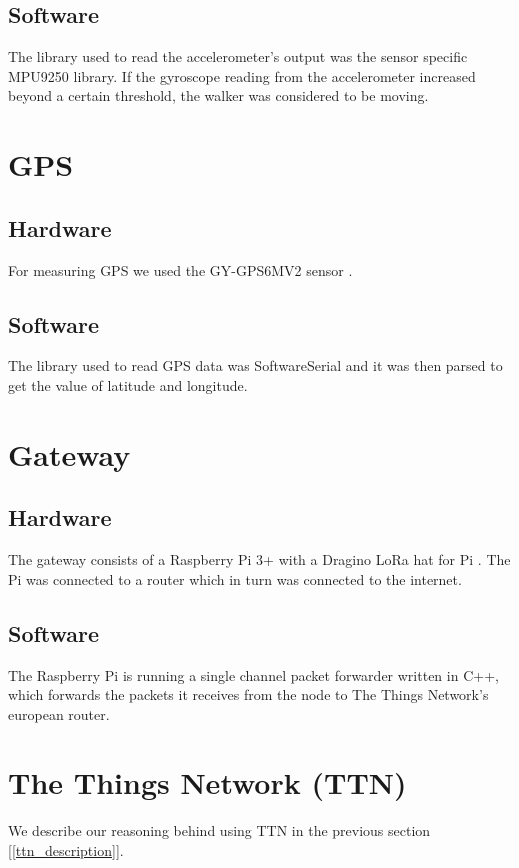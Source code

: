 	\subsection*{Software}
	The library used to read the accelerometer's output was the sensor specific MPU9250 library. If the gyroscope reading from the accelerometer increased beyond a certain threshold, the walker was considered to be moving.

\section{GPS}

	\subsection*{Hardware}
	For measuring GPS we used the GY-GPS6MV2 sensor \cite{gpsds}.

	\subsection*{Software}
	The library used to read GPS data was SoftwareSerial and it was then parsed to get the value of latitude and longitude.

\section{Gateway}
		
	\subsection*{Hardware}
	The gateway consists of a Raspberry Pi 3+ with a Dragino LoRa hat for Pi \cite{lorashield}. The Pi was connected to a router which in turn was connected to the internet.


	\subsection*{Software}
	The Raspberry Pi is running a single channel packet forwarder written in C++, which forwards the packets it receives from the node to The Things Network's european router. 

\section{The Things Network (TTN)}
	We describe our reasoning behind using TTN in the previous section [\ref{ttn_description}].


